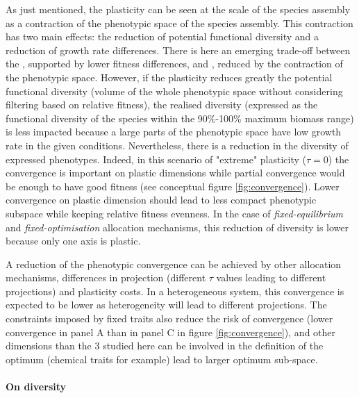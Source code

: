 As just mentioned, the plasticity can be seen at the scale of the species assembly  as a contraction of the phenotypic space of the species assembly. This contraction has two main effects: the reduction of potential functional diversity and a reduction of growth rate differences. There is here an emerging trade-off between the , supported by lower fitness differences, and , reduced by the contraction of the phenotypic space. However, if the plasticity reduces greatly the potential functional diversity (volume of the whole phenotypic space without considering filtering based on relative fitness), the realised diversity (expressed as the functional diversity of the species within the 90\%-100\% maximum biomass range) is less impacted because a large parts of the phenotypic space have low growth rate in the given conditions. Nevertheless, there is a reduction in the diversity of expressed phenotypes. Indeed, in this scenario of "extreme" plasticity ($\tau = 0$) the convergence is important on plastic dimensions while partial convergence would be enough to have good fitness (see conceptual figure \ref{fig:convergence}). Lower convergence on plastic dimension should lead to less compact phenotypic subspace while keeping relative fitness evenness. In the case of \textit{fixed-equilibrium} and \textit{fixed-optimisation} allocation mechanisms, this reduction of diversity is lower because only one axis is plastic.

A reduction of the phenotypic convergence can be achieved by other allocation mechanisms, differences in projection (different $\tau$ values leading to different projections) and plasticity costs. In a heterogeneous system, this convergence is expected to be lower as heterogeneity will lead to different projections. The constraints imposed by fixed traits also reduce the risk of convergence (lower convergence in panel A than in panel C in figure \ref{fig:convergence}), and other dimensions than the 3 studied here can be involved in the definition of the optimum (chemical traits for example) lead to larger optimum sub-space.


\paragraph{On diversity}

